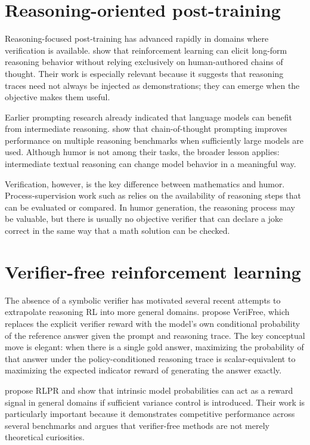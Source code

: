 \documentclass[14pt,a4paper]{extreport}
\begin{document}
\section{Reasoning-oriented post-training}

Reasoning-focused post-training has advanced rapidly in domains where verification is available. \citet{DeepSeek2025} show that reinforcement learning can elicit long-form reasoning behavior without relying exclusively on human-authored chains of thought. Their work is especially relevant because it suggests that reasoning traces need not always be injected as demonstrations; they can emerge when the objective makes them useful.

Earlier prompting research already indicated that language models can benefit from intermediate reasoning. \citet{Wei2022} show that chain-of-thought prompting improves performance on multiple reasoning benchmarks when sufficiently large models are used. Although humor is not among their tasks, the broader lesson applies: intermediate textual reasoning can change model behavior in a meaningful way.

Verification, however, is the key difference between mathematics and humor. Process-supervision work such as \citet{Lightman2023} relies on the availability of reasoning steps that can be evaluated or compared. In humor generation, the reasoning process may be valuable, but there is usually no objective verifier that can declare a joke correct in the same way that a math solution can be checked.

\section{Verifier-free reinforcement learning}

The absence of a symbolic verifier has motivated several recent attempts to extrapolate reasoning RL into more general domains. \citet{Zhou2025} propose VeriFree, which replaces the explicit verifier reward with the model's own conditional probability of the reference answer given the prompt and reasoning trace. The key conceptual move is elegant: when there is a single gold answer, maximizing the probability of that answer under the policy-conditioned reasoning trace is scalar-equivalent to maximizing the expected indicator reward of generating the answer exactly.

\citet{Yu2025} propose RLPR and show that intrinsic model probabilities can act as a reward signal in general domains if sufficient variance control is introduced. Their work is particularly important because it demonstrates competitive performance across several benchmarks and argues that verifier-free methods are not merely theoretical curiosities.
\end{document}
